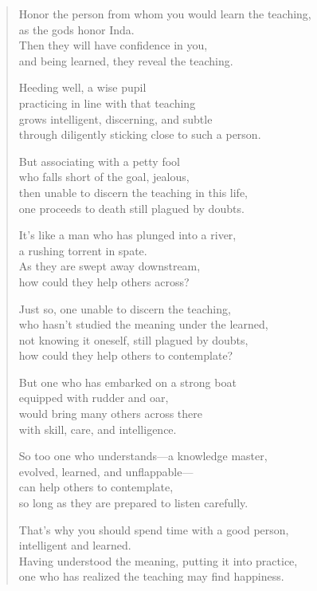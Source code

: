 \documentclass[12pt,openany]{book}%
\begin{document}
\begin{verse}%
Honor the person from whom you would learn the teaching, \\
as the gods honor Inda. \\
Then they will have confidence in you, \\
and being learned, they reveal the teaching. 

Heeding well, a wise pupil \\
practicing in line with that teaching \\
grows intelligent, discerning, and subtle \\
through diligently sticking close to such a person. 

But associating with a petty fool \\
who falls short of the goal, jealous, \\
then unable to discern the teaching in this life, \\
one proceeds to death still plagued by doubts. 

It’s like a man who has plunged into a river, \\
a rushing torrent in spate. \\
As they are swept away downstream, \\
how could they help others across? 

Just so, one unable to discern the teaching, \\
who hasn’t studied the meaning under the learned, \\
not knowing it oneself, still plagued by doubts, \\
how could they help others to contemplate? 

But one who has embarked on a strong boat \\
equipped with rudder and oar, \\
would bring many others across there \\
with skill, care, and intelligence. 

So too one who understands—a knowledge master, \\
evolved, learned, and unflappable—\\
can help others to contemplate, \\
so long as they are prepared to listen carefully. 

That’s why you should spend time with a good person, \\
intelligent and learned. \\
Having understood the meaning, putting it into practice, \\
one who has realized the teaching may find happiness. 

%
\end{verse}
\end{document}
